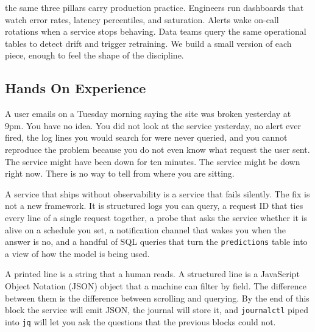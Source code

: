  the same three pillars carry production
practice. Engineers run dashboards that watch error rates, latency
percentiles, and saturation. Alerts wake on-call rotations when a
service stops behaving. Data teams query the same operational tables to
detect drift and trigger retraining. We build a small version of each
piece, enough to feel the shape of the discipline.

\newpage
\subsection{Hands On Experience}

 A user emails on a Tuesday morning
saying the site was broken yesterday at 9pm. You have no idea. You did
not look at the service yesterday, no alert ever fired, the log lines
you would search for were never queried, and you cannot reproduce the
problem because you do not even know what request the user sent. The
service might have been down for ten minutes. The service might be down
right now. There is no way to tell from where you are sitting.

A service that ships without observability is a service that fails
silently. The fix is not a new framework. It is structured logs you can
query, a request ID that ties every line of a single request together,
a probe that asks the service whether it is alive on a schedule you set,
a notification channel that wakes you when the answer is no, and a
handful of SQL queries that turn the \texttt{predictions} table into a
view of how the model is being used.


A printed line is a string that a human reads. A structured line is a
JavaScript Object Notation (JSON) object that a machine can filter by
field. The difference between them is the difference between scrolling
and querying. By the end of this block the service will emit JSON, the
journal will store it, and \texttt{journalctl} piped into \texttt{jq}
will let you ask the questions that the previous blocks could not.

